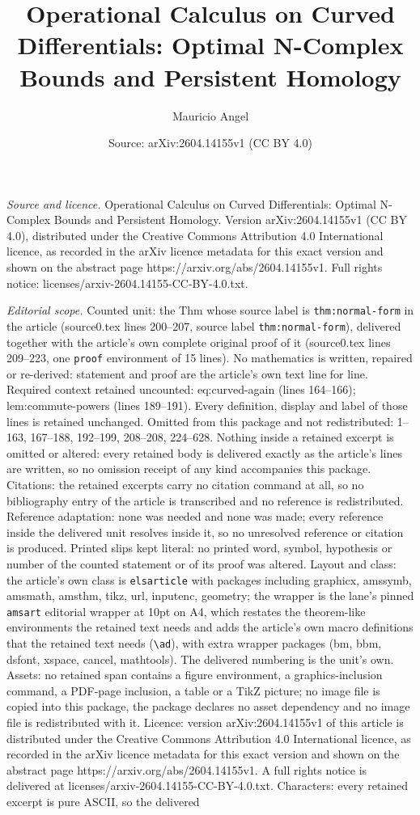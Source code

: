 \documentclass[10pt,a4paper]{amsart}
\title[Operational Calculus on Curved Differentials: Optimal N-Comp]{Operational Calculus on Curved Differentials: Optimal N-Complex Bounds and Persistent Homology}
\author{Mauricio Angel}
\date{Source: arXiv:2604.14155v1 (CC BY 4.0)}
\begin{document}
\maketitle

\noindent\emph{Source and licence.} Operational Calculus on Curved Differentials: Optimal N-Complex Bounds and Persistent Homology. Version arXiv:2604.14155v1 (CC BY 4.0), distributed under the Creative Commons Attribution 4.0 International licence, as recorded in the arXiv licence metadata for this exact version and shown on the abstract page https://arxiv.org/abs/2604.14155v1. Full rights notice: licenses/arxiv-2604.14155-CC-BY-4.0.txt.\par\smallskip

\noindent\textit{Editorial scope.} Counted unit: the Thm whose source label is \texttt{thm:normal-form} in the article (source0.tex lines 200--207, source label \texttt{thm:normal-form}), delivered together with the article's own complete original proof of it (source0.tex lines 209--223, one \texttt{proof} environment of 15 lines). No mathematics is written, repaired or re-derived: statement and proof are the article's own text line for line. Required context retained uncounted: eq:curved-again (lines 164--166); lem:commute-powers (lines 189--191). Every definition, display and label of those lines is retained unchanged. Omitted from this package and not redistributed: 1--163, 167--188, 192--199, 208--208, 224--628. Nothing inside a retained excerpt is omitted or altered: every retained body is delivered exactly as the article's lines are written, so no omission receipt of any kind accompanies this package. Citations: the retained excerpts carry no citation command at all, so no bibliography entry of the article is transcribed and no reference is redistributed. Reference adaptation: none was needed and none was made; every reference inside the delivered unit resolves inside it, so no unresolved reference or citation is produced. Printed slips kept literal: no printed word, symbol, hypothesis or number of the counted statement or of its proof was altered. Layout and class: the article's own class is \texttt{elsarticle} with packages including graphicx, amssymb, amsmath, amsthm, tikz, url, inputenc, geometry; the wrapper is the lane's pinned \texttt{amsart} editorial wrapper at 10pt on A4, which restates the theorem-like environments the retained text needs and adds the article's own macro definitions that the retained text needs (\texttt{\textbackslash ad}), with extra wrapper packages (bm, bbm, dsfont, xspace, cancel, mathtools). The delivered numbering is the unit's own. Assets: no retained span contains a figure environment, a graphics-inclusion command, a PDF-page inclusion, a table or a TikZ picture; no image file is copied into this package, the package declares no asset dependency and no image file is redistributed with it. Licence: version arXiv:2604.14155v1 of this article is distributed under the Creative Commons Attribution 4.0 International licence, as recorded in the arXiv licence metadata for this exact version and shown on the abstract page https://arxiv.org/abs/2604.14155v1. A full rights notice is delivered at licenses/arxiv-2604.14155-CC-BY-4.0.txt. Characters: every retained excerpt is pure ASCII, so the delivered 
\end{document}
